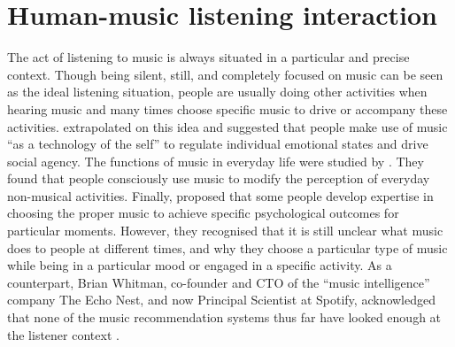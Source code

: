 







\chapter{Human-music listening interaction}\label{ch:human-music-listening-interaction}
\graphicspath{{./figs/ch2} }
The act of listening to music is always situated in a particular and precise context. Though being silent, still, and completely focused on music can be seen as the ideal listening situation, people are usually doing other activities when hearing music and many times choose specific music to drive or accompany these activities.
\textcite{denora99music} extrapolated on this idea and suggested that people make use of music ``as a technology of the self'' to regulate individual emotional states and drive social agency. 
The functions of music in everyday life were studied by \textcite{sloboda01functions}. They  found that people consciously use music to modify the perception of everyday non-musical activities. Finally, \textcite{sloboda09choosing} proposed that some people develop expertise in choosing the proper music to achieve specific psychological outcomes for particular moments. However, they recognised that it is still unclear what music does to people at different times, and why they choose a particular type of music while being in a particular mood or engaged in a specific activity.
As a counterpart, Brian Whitman, co-founder and CTO of the ``music intelligence'' company The Echo Nest, and now Principal Scientist at Spotify, acknowledged that none of the music recommendation systems thus far have looked enough at the listener context \autocite{whitman13music}.


